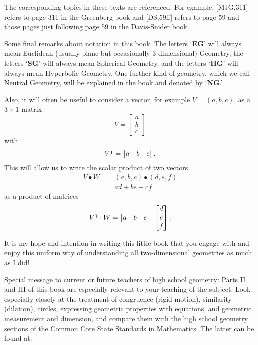 \documentclass{ximera}
\begin{document}
The corresponding topics in these texts are referenced. For example, [MJG,311]
refers to page 311 in the Greenberg book and [DS,59ff] refers to page 59 and
those pages just following page 59 in the Davis-Snider book.

Some final remarks about notation in this book. The letters `\textbf{EG}' will
always mean Euclidean (usually plane but occasionally $3$-dimensional)
Geometry, the letters `\textbf{SG}' will always mean Spherical Geometry, and
the letters `\textbf{HG}' will always mean Hyperbolic Geometry. One further
kind of geometry, which we call Neutral Geometry, will be explained in the
book and denoted by `\textbf{NG}.'

Also, it will often be useful to consider a vector, for example
$V=\left(a,b,c\right)$, as a $3\times1$ matrix
\[
V  =
\begin{bmatrix}
a\\
b\\
c
\end{bmatrix}
\]
with
\[
V^\intercal=
\begin{bmatrix}
a & b & c
\end{bmatrix}.
\]
This will allow us to write the scalar product of two vectors%
\begin{align*}
V\bullet W  &  =\left(  a,b,c\right)  \bullet\left(d,e,f\right) \\
&  =ad+be+cf%
\end{align*}
as a product of matrices%
\[
V^\intercal\cdot W=
\begin{bmatrix}
a & b & c
\end{bmatrix} 
\cdot
\begin{bmatrix}
d\\
e\\
f
\end{bmatrix}.
\]


It is my hope and intention in writing this little book that you engage with
and enjoy this uniform way of understanding all two-dimensional geometries as
much as I did!

\begin{remark}
Special message to current or future teachers of high school geometry: Parts
II and III of this book are especially relevant to your teaching of the
subject. Look especially closely at the treatment of congruence (rigid
motion), similarity (dilation), circles, expressing geometric properties with
equations, and geometric measurement and dimension, and compare them with the
high school geometry sections of the Common Core State Standards in
Mathematics. The latter can be found at:
\end{remark}
\end{document}
